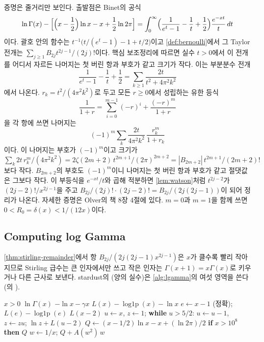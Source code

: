 증명은 줄거리만 보인다. 출발점은 Binet의 공식
\[
\ln\Gamma(x)-\Bigl[\Bigl(x-\frac12\Bigr)\ln x-x+\frac12\ln2\pi\Bigr]=\int_0^\infty\Bigl(\frac{1}{e^t-1}-\frac1t+\frac12\Bigr)\frac{e^{-xt}}{t}\,dt
\]
이다. 괄호 안의 함수는 $t^{-1}\bigl(t/(e^t-1)-1+t/2\bigr)$이고 \cref{def:bernoulli}에서 그 Taylor 전개는 $\sum_{j\ge1}B_{2j}t^{2j-1}/(2j)!$이다. 핵심 보조정리에 따르면 실수 $t>0$에서 이 전개를 어디서 자르든 나머지는 첫 버린 항과 부호가 같고 크기가 작다. 이는 부분분수 전개
\[
\frac{1}{e^t-1}-\frac1t+\frac12=\sum_{k\ge1}\frac{2t}{t^2+4\pi^2k^2}
\]
에서 나온다. $r_k=t^2/(4\pi^2k^2)$로 두고 모든 $r\ge0$에서 성립하는 유한 등식
\[
\frac{1}{1+r}=\sum_{i=0}^{m-1}(-r)^i+\frac{(-r)^m}{1+r}
\]
을 각 항에 쓰면 나머지는
\[
(-1)^m\sum_k\frac{2t}{4\pi^2k^2}\,\frac{r_k^m}{1+r_k}
\]
이다. 이 나머지는 부호가 $(-1)^m$이고 크기가 $\sum_k2t\,r_k^m/(4\pi^2k^2)=2\zeta(2m+2)\,t^{2m+1}/(2\pi)^{2m+2}=|B_{2m+2}|\,t^{2m+1}/(2m+2)!$보다 작다. $B_{2m+2}$의 부호도 $(-1)^m$이니 나머지는 첫 버린 항과 부호가 같고 절댓값은 그보다 작다. 이 부등식을 $e^{-xt}/t$와 곱해 적분하면 \cref{lem:watson}처럼 $t^{2j-2}$가 $(2j-2)!/x^{2j-1}$을 주고 $B_{2j}/(2j)!\cdot(2j-2)!=B_{2j}/(2j(2j-1))$이 되어 정리가 나온다. 자세한 증명은 Olver의 책 8장 4절에 있다\cite{olver1974asymptotics}. $m=0$과 $m=1$을 함께 쓰면 $0<R_0=\delta(x)<1/(12x)$이다.

\subsection{Computing log Gamma}

\cref{thm:stirling-remainder}에서 항 $B_{2j}/(2j(2j-1)x^{2j-1})$은 $x$가 클수록 빨리 작아지므로 Stirling 급수는 큰 인자에서만 쓰고 작은 인자는 $\Gamma(x+1)=x\Gamma(x)$로 키우거나 다른 근사로 보낸다. stardust의 (양의 실수)은 \cref{alg:lgamma}의 여섯 영역을 쓴다(의 ).

\begin{algorithm}[htbp]
\begin{algorithmic}[1]
\Require $x>0$
\Ensure $\ln\Gamma(x)$
 \Return $-\ln x-\gamma x$ 
 \Return $L(x)-\operatorname{log1p}(x)-\ln x$ 
 $e\gets x-1$ (정확); \Return $L(e)-\operatorname{log1p}(e)$
 \Return $L(x-2)$
 $u\gets x$, $z\gets1$; \textbf{while} $u>5/2$: $u\gets u-1$, $z\gets zu$; \Return $\ln z+L(u-2)$
\Else
  \State $Q\gets(x-1/2)\ln x-x+(\ln2\pi)/2$ 
  \State \textbf{if} $x>10^8$ \textbf{then} \Return $Q$ 
  \State $w\gets1/x$; \Return $Q+A(w^2)\,w$ 
\EndIf
\end{algorithmic}
\caption{양의 실수에서 $\ln\Gamma$ (stardust )}
\label{alg:lgamma}
\end{algorithm}

